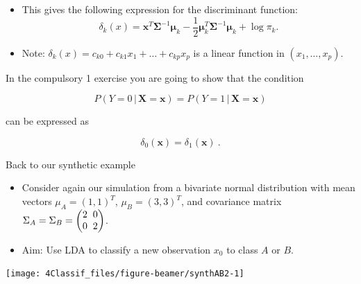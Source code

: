\documentclass[10pt,ignorenonframetext,]{beamer}
\begin{document}
\begin{frame}

\begin{itemize}
\item
  This gives the following expression for the discriminant function:
  \[\delta_k(x) = {\boldsymbol x}^T \boldsymbol{\Sigma}^{-1}\boldsymbol\mu_k - \frac{1}{2}\boldsymbol\mu_k^T \boldsymbol{\Sigma}^{-1}\boldsymbol\mu_k + \log \pi_k.\]
\item
  Note: \(\delta_k(x) = c_{k0} + c_{k1}x_1 + \ldots + c_{kp}x_p\) is a
  linear function in \((x_1,\ldots ,x_p)\).
\end{itemize}

\end{frame}

\begin{frame}

In the compulsory 1 exercise you are going to show that the condition

\[P(Y=0 \,|\, \boldsymbol{X}=\boldsymbol{x}) = P(Y=1  \,|\, \boldsymbol{X}=\boldsymbol{x}) \]

can be expressed as

\[\delta_0({\boldsymbol x}) = \delta_1({\boldsymbol x}) \ .\]

\end{frame}

\begin{frame}

\begin{block}{Back to our synthetic example}

\begin{itemize}
\item
  Consider again our simulation from a bivariate normal distribution
  with mean vectors \(\mu_A = (1, 1)^T\), \(\mu_B = (3, 3)^T\), and
  covariance matrix
  \(\Sigma_A = \Sigma_B = \begin{pmatrix} 2\hspace{2mm} 0 \\ 0 \hspace{2mm} 2 \end{pmatrix}\).
\item
  Aim: Use LDA to classify a new observation \(x_0\) to class \(A\) or
  \(B\).
\end{itemize}

\begin{center}\texttt{[image: 4Classif\_files/figure-beamer/synthAB2-1]} \end{center}

\end{block}

\end{frame}
\end{document}
